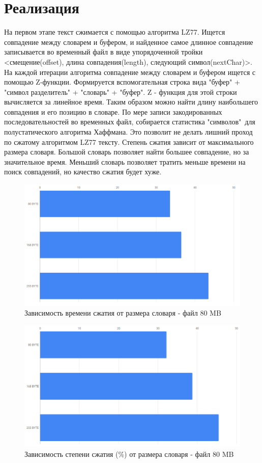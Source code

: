 \documentclass[14pt]{article}
\begin{document}
\section*{Реализация}
На первом этапе текст сжимается с помощью алгоритма LZ77. Ищется совпадение между словарем и буфером, и найденное самое длинное совпадение записывается во временный файл в виде упорядоченной тройки <смещение(offset), длина совпадения(length), следующий символ(nextChar)>. На каждой итерации алгоритма совпадение между словарем и буфером ищется с помощью  \mbox{Z-функции.} Формируется вспомогательная строка вида "буфер" + "символ разделитель" + "словарь" + "буфер". Z - функция для этой строки вычисляется за линейное время. Таким образом можно найти длину наибольшего совпадения и его позицию в словаре. По мере записи закодированных последовательностей во временных файл, собирается статистика "символов"\  для полустатического алгоритма Хаффмана. Это позволит не делать лишний проход по сжатому алгоритмом LZ77 тексту. Степень сжатия зависит от максимального размера словаря. Большой словарь позволяет найти большее совпадение, но за значительное время. Меньший словарь позволяет тратить меньше времени на поиск совпадений,  но качество сжатия будет хуже. 

\begin{figure}[h]
\centering
\includegraphics[width=1\linewidth]{11.png}
\caption{Зависимость времени сжатия от размера словаря - файл 80 MB}
\label{fig:mpr}
\end{figure}

\pagebreak

\begin{figure}[h]
\centering
\includegraphics[width=1\linewidth]{12.png}
\caption{Зависимость степени сжатия (\%) от размера словаря - файл 80 MB}
\label{fig:mpr}
\end{figure}
\end{document}
